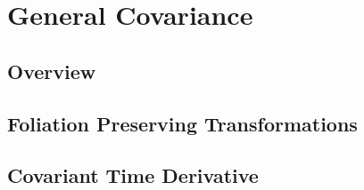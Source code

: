 \chapter{General Covariance}
\section{Overview}
\section{Foliation Preserving Transformations}
\section{Covariant Time Derivative}
